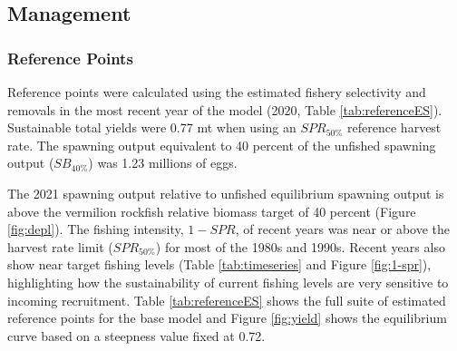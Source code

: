 \documentclass[11pt,
  english,
  a4paper,
]{article}
\begin{document}
\leavevmode\tagmcend\tagstructend\par


\hypertarget{management}{%
\subsection{Management}\label{management}}

\leavevmode\tagmcend\tagstructend


\hypertarget{reference-points-1}{%
\subsubsection{Reference Points}\label{reference-points-1}}

\leavevmode\tagmcend\tagstructend


Reference points were calculated using the estimated fishery selectivity and removals in the most recent year of the model (2020, Table \ref{tab:referenceES}). Sustainable total yields were 0.77 mt when using an {\(SPR_{50\%}\)\leavevmode\tagmcend\tagstructend} reference harvest rate. The spawning output equivalent to 40 percent of the unfished spawning output ({\(SB_{40\%}\)\leavevmode\tagmcend\tagstructend}) was 1.23 millions of eggs.

\leavevmode\tagmcend\tagstructend\par


The 2021 spawning output relative to unfished equilibrium spawning output is above the vermilion rockfish relative biomass target of 40 percent (Figure \ref{fig:depl}). The fishing intensity, {\(1-SPR\)\leavevmode\tagmcend\tagstructend}, of recent years was near or above the harvest rate limit ({\(SPR_{50\%}\)\leavevmode\tagmcend\tagstructend}) for most of the 1980s and 1990s. Recent years also show near target fishing levels (Table \ref{tab:timeseries} and Figure \ref{fig:1-spr}), highlighting how the sustainability of current fishing levels are very sensitive to incoming recruitment. Table \ref{tab:referenceES} shows the full suite of estimated reference points for the base model and Figure \ref{fig:yield} shows the equilibrium curve based on a steepness value fixed at 0.72.
\end{document}
